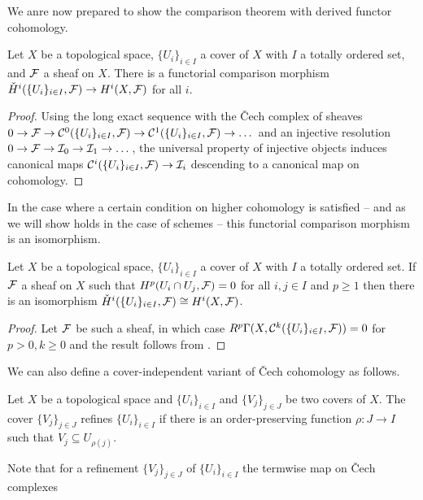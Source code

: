 We anre now prepared to show the comparison theorem with derived functor cohomology. 
\begin{theorem}\label{thm: Cech to derived functor comparison}
    Let $X$ be a topological space, $\{U_{i}\}_{i\in I}$ a cover of $X$ with $I$ a totally ordered set, and $\mathcal{F}$ a sheaf on $X$. There is a functorial comparison morphism $\check{H}^{i}(\{U_{i}\}_{i\in I},\mathcal{F})\to H^{i}(X,\mathcal{F})$ for all $i$. 
\end{theorem}
\begin{proof}
    Using the long exact sequence with the \v{C}ech complex of sheaves $0\to\mathcal{F}\to\mathcal{C}^{0}(\{U_{i}\}_{i\in I},\mathcal{F})\to\mathcal{C}^{1}(\{U_{i}\}_{i\in I},\mathcal{F})\to\dots$ and an injective resolution $0\to\mathcal{F}\to\mathcal{I}_{0}\to\mathcal{I}_{1}\to\dots$, the universal property of injective objects induces canonical maps $\mathcal{C}^{i}(\{U_{i}\}_{i\in I},\mathcal{F})\to\mathcal{I}_{i}$ descending to a canonical map on cohomology. 
\end{proof}
In the case where a certain condition on higher cohomology is satisfied -- and as we will show holds in the case of schemes -- this functorial comparison morphism is an isomorphism. 
\begin{proposition}\label{prop: comparison between Cech and derived functor cohomology is an isomorphism}
    Let $X$ be a topological space, $\{U_{i}\}_{i\in I}$ a cover of $X$ with $I$ a totally ordered set. If $\mathcal{F}$ a sheaf on $X$ such that $H^{p}(U_{i}\cap U_{j},\mathcal{F})=0$ for all $i,j\in I$ and $p\geq 1$ then there is an isomorphism $\check{H}^{i}(\{U_{i}\}_{i\in I},\mathcal{F})\cong H^{i}(X,\mathcal{F})$.
\end{proposition}
\begin{proof}
    Let $\mathcal{F}$ be such a sheaf, in which case $R^{p}\Gamma(X,\mathcal{C}^{k}(\{U_{i}\}_{i\in I},\mathcal{F}))=0$ for $p>0, k\geq0$ and the result follows from . 
\end{proof}
We can also define a cover-independent variant of \v{C}ech cohomology as follows. 
\begin{definition}\label{def: refinement of cover}
    Let $X$ be a topological space and $\{U_{i}\}_{i\in I}$ and $\{V_{j}\}_{j\in J}$ be two covers of $X$. The cover $\{V_{j}\}_{j\in J}$ refines $\{U_{i}\}_{i\in I}$ if there is an order-preserving function $\rho:J\to I$ such that $V_{j}\subseteq U_{\rho(j)}$. 
\end{definition}
Note that for a refinement $\{V_{j}\}_{j\in J}$ of $\{U_{i}\}_{i\in I}$ the termwise map on \v{C}ech complexes 
